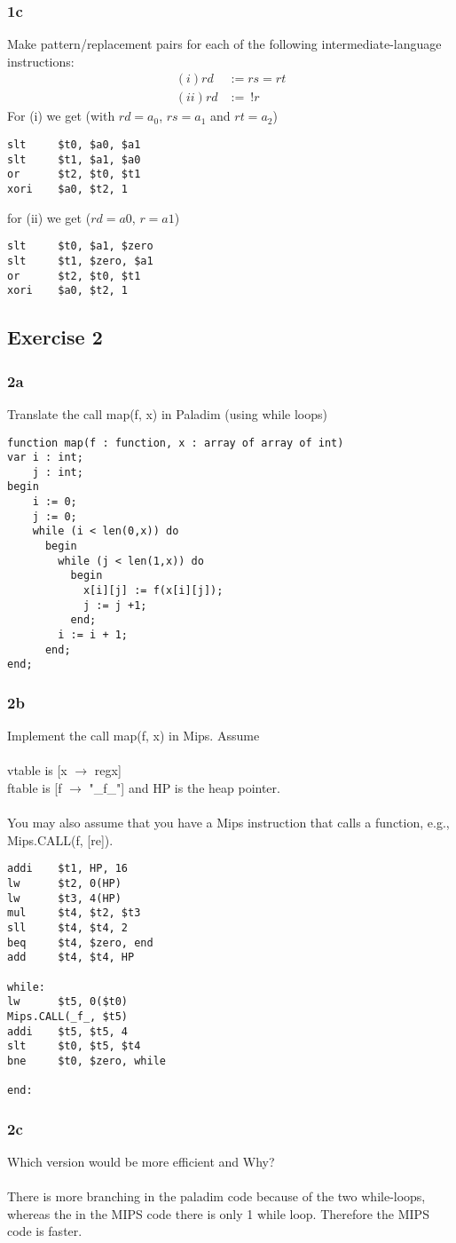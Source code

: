 \documentclass[12pt]{article}
\begin{document}
\subsubsection*{1c}
Make pattern/replacement pairs for each of the following intermediate-language instructions:
\begin{align*}
(i) rd &:= rs = rt\\
(ii) rd &:=\:!r
\end{align*}
For (i) we get (with $rd=a_0$, $rs=a_1$ and $rt=a_2$)
\begin{verbatim}
slt		$t0, $a0, $a1
slt 	$t1, $a1, $a0
or		$t2, $t0, $t1
xori	$a0, $t2, 1
\end{verbatim}
for (ii) we get ($rd=a0$, $r=a1$)
\begin{verbatim}
slt		$t0, $a1, $zero
slt 	$t1, $zero, $a1
or		$t2, $t0, $t1
xori	$a0, $t2, 1
\end{verbatim}

\newpage

\subsection*{Exercise 2}
\subsubsection*{2a}
Translate the call map(f, x) in Paladim (using while loops)
\begin{verbatim}
function map(f : function, x : array of array of int)
var i : int;
    j : int;
begin
    i := 0;
    j := 0;
    while (i < len(0,x)) do
      begin
        while (j < len(1,x)) do
          begin
            x[i][j] := f(x[i][j]);
            j := j +1;
          end;
        i := i + 1;
      end;
end;
\end{verbatim}

\subsubsection*{2b}
Implement the call map(f, x) in Mips. Assume\\\\
vtable is [x $\rightarrow$ regx]  \\
ftable  is [f $\rightarrow$ "\_f\_"] and HP is the heap pointer.\\\\
You may also assume that you have a Mips instruction that calls a function, e.g., Mips.CALL(f, [re]).
\begin{verbatim}
addi    $t1, HP, 16
lw      $t2, 0(HP)
lw      $t3, 4(HP)
mul     $t4, $t2, $t3
sll     $t4, $t4, 2
beq     $t4, $zero, end
add     $t4, $t4, HP

while:
lw      $t5, 0($t0)
Mips.CALL(_f_, $t5)
addi    $t5, $t5, 4
slt     $t0, $t5, $t4
bne     $t0, $zero, while

end:

\end{verbatim}

\subsubsection*{2c}
Which version would be more efficient and Why?\\
\\
There is more branching in the paladim code because of the two while-loops, whereas the in the MIPS code there is only 1 while loop. Therefore the MIPS code is faster.
\end{document}
